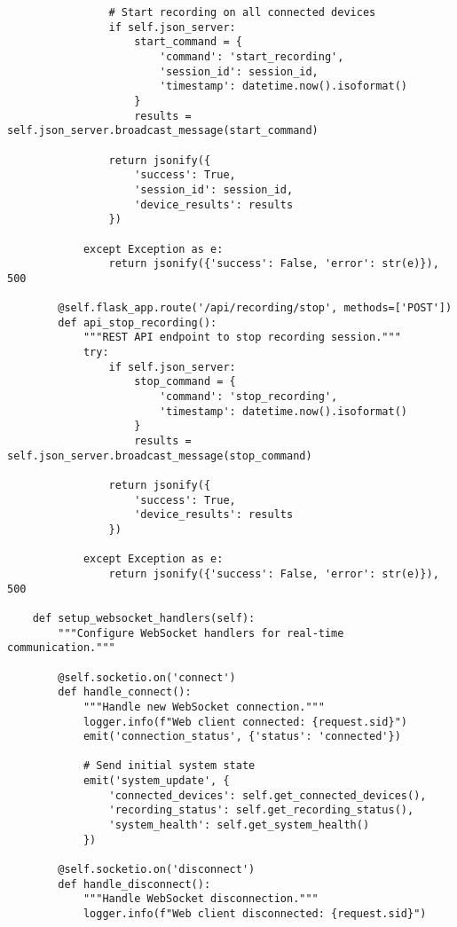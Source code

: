 \documentclass[12pt,a4paper]{article}
\begin{document}
\begin{verbatim}
                # Start recording on all connected devices
                if self.json_server:
                    start_command = {
                        'command': 'start_recording',
                        'session_id': session_id,
                        'timestamp': datetime.now().isoformat()
                    }
                    results = self.json_server.broadcast_message(start_command)

                return jsonify({
                    'success': True,
                    'session_id': session_id,
                    'device_results': results
                })

            except Exception as e:
                return jsonify({'success': False, 'error': str(e)}), 500

        @self.flask_app.route('/api/recording/stop', methods=['POST'])
        def api_stop_recording():
            """REST API endpoint to stop recording session."""
            try:
                if self.json_server:
                    stop_command = {
                        'command': 'stop_recording',
                        'timestamp': datetime.now().isoformat()
                    }
                    results = self.json_server.broadcast_message(stop_command)

                return jsonify({
                    'success': True,
                    'device_results': results
                })

            except Exception as e:
                return jsonify({'success': False, 'error': str(e)}), 500

    def setup_websocket_handlers(self):
        """Configure WebSocket handlers for real-time communication."""

        @self.socketio.on('connect')
        def handle_connect():
            """Handle new WebSocket connection."""
            logger.info(f"Web client connected: {request.sid}")
            emit('connection_status', {'status': 'connected'})

            # Send initial system state
            emit('system_update', {
                'connected_devices': self.get_connected_devices(),
                'recording_status': self.get_recording_status(),
                'system_health': self.get_system_health()
            })

        @self.socketio.on('disconnect')
        def handle_disconnect():
            """Handle WebSocket disconnection."""
            logger.info(f"Web client disconnected: {request.sid}")


\end{verbatim}
\end{document}

